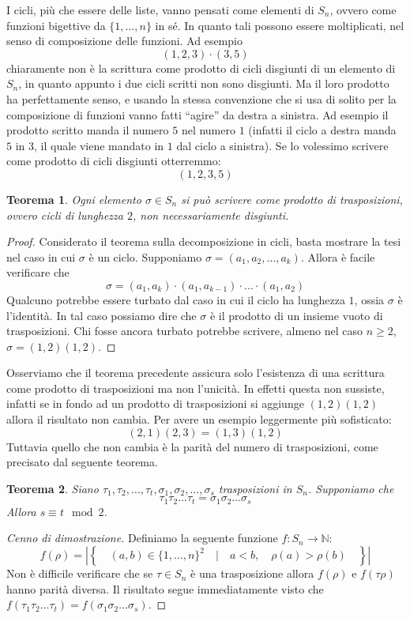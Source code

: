 \documentclass[11pt]{article}
\theoremstyle{plain}
\newtheorem{thm}{Teorema}[section]
\theoremstyle{definition}
\theoremstyle{remark}
\newcommand{\N}{\mathbb{N}}
\begin{document}
I cicli, più che essere delle liste, vanno pensati come elementi di $S_n$, ovvero come funzioni bigettive da $\{1,\dots,n\}$ in sé.
In quanto tali possono essere moltiplicati, nel senso di composizione delle funzioni. Ad esempio
\[(1,2,3)\cdot(3,5)\]
chiaramente non è la scrittura come prodotto di cicli disgiunti di un elemento di $S_n$, in quanto appunto i due cicli scritti
non sono disgiunti. Ma il loro prodotto ha perfettamente senso, e usando la stessa convenzione
che si usa di solito per la composizione di funzioni vanno fatti ``agire'' da destra a sinistra.
Ad esempio il prodotto scritto manda il numero $5$ nel numero $1$ (infatti il ciclo a destra manda $5$ in $3$, il quale viene mandato in $1$ dal ciclo
a sinistra). Se lo volessimo scrivere come prodotto di cicli disgiunti otterremmo:
\[(1,2,3,5)\]

\begin{thm}
Ogni elemento $\sigma \in S_n$ si può scrivere come prodotto di \emph{trasposizioni}, ovvero cicli di lunghezza $2$, non necessariamente disgiunti.
\end{thm}
\begin{proof}
Considerato il teorema sulla decomposizione in cicli, basta mostrare la tesi nel caso in cui $\sigma$ è un ciclo.
Supponiamo $\sigma = (a_1, a_2, \dots, a_k)$. Allora è facile verificare che
\[\sigma = (a_1, a_k)\cdot (a_1, a_{k-1}) \cdot \dots \cdot (a_1, a_2)\]
Qualcuno potrebbe essere turbato dal caso in cui il ciclo ha lunghezza $1$, ossia $\sigma$ è l'identità.
In tal caso possiamo dire che $\sigma$ è il prodotto di un insieme vuoto di trasposizioni.
Chi fosse ancora turbato potrebbe scrivere, almeno nel caso $n\ge 2$, $\sigma = (1,2)(1,2)$.
\end{proof}

Osserviamo che il teorema precedente assicura solo l'esistenza di una scrittura come prodotto di trasposizioni
ma non l'unicità. In effetti questa non sussiste, infatti se in fondo ad un prodotto di trasposizioni si aggiunge $(1,2)(1,2)$
allora il risultato non cambia. Per avere un esempio leggermente più sofisticato:
\[(2,1)(2,3) = (1,3)(1,2)\]
Tuttavia quello che non cambia è la parità del numero di trasposizioni, come precisato dal seguente teorema.
\begin{thm}
Siano $\tau_1, \tau_2, \dots, \tau_t, \sigma_1, \sigma_2, \dots, \sigma_s$ trasposizioni in $S_n$. Supponiamo che
\[\tau_1\tau_2\dots\tau_t = \sigma_1\sigma_2\dots\sigma_s\]
Allora $s\equiv t \mod 2$.
\end{thm}
\begin{proof}[Cenno di dimostrazione]
Definiamo la seguente funzione $f:S_n\to\N$:
\[f(\rho) = |\left\{\quad(a,b)\in\{1,\dots,n\}^2 \quad | \quad a < b, \quad\rho(a) > \rho(b) \quad\right\}|\]
Non è difficile verificare che se $\tau\in S_n$ è una trasposizione allora $f(\rho)$ e $f(\tau\rho)$ hanno parità diversa.
Il risultato segue immediatamente visto che $f(\tau_1\tau_2\dots\tau_t) = f(\sigma_1\sigma_2\dots\sigma_s)$.
\end{proof}
\end{document}
